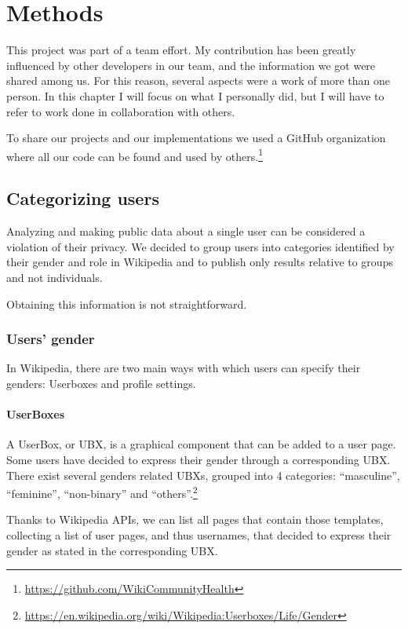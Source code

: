 \chapter{Methods}
\label{cha:methods}
This project was part of a team effort. My contribution has been greatly influenced by other developers in our team, and the information we got were shared among us. For this reason, several aspects were a work of more than one person. In this chapter I will focus on what I personally did, but I will have to refer to work done in collaboration with others.

To share our projects and our implementations we used a GitHub organization where all our code can be found and used by others.\footnote{\url{https://github.com/WikiCommunityHealth}}

\section{Categorizing users}
\label{sec:categorizingusers}
Analyzing and making public data about a single user can be considered a violation of their privacy. We decided to group users into categories identified by their gender and role in Wikipedia and to publish only results relative to groups and not individuals.

Obtaining this information is not straightforward.

\subsection{Users' gender}
\label{sec:usersgender}
In Wikipedia, there are two main ways with which users can specify their genders: Userboxes and profile settings.

\subsubsection{UserBoxes}
\label{sec:usersboxes}
A UserBox, or UBX, is a graphical component that can be added to a user page. Some users have decided to express their gender through a corresponding UBX. There exist several genders related UBXs, grouped into 4 categories: “masculine”, “feminine”, “non-binary” and “others”.\footnote{\url{https://en.wikipedia.org/wiki/Wikipedia:Userboxes/Life/Gender}}

Thanks to Wikipedia APIs, we can list all pages that contain those templates, collecting a list of user pages, and thus usernames, that decided to express their gender as stated in the corresponding UBX.

